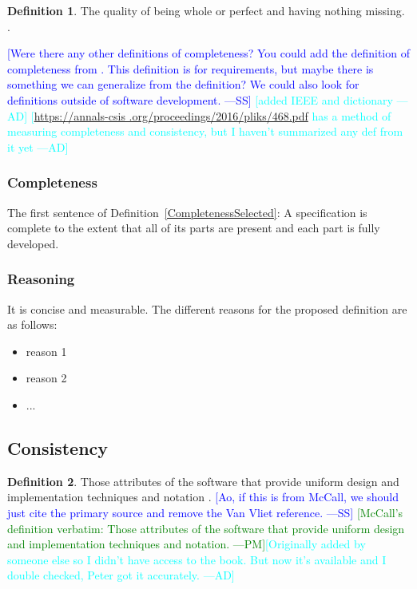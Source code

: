\documentclass[letterpaper, cleveref]{lipics-v2019}
\newcommand{\authornote}[3]{\textcolor{#1}{[#3 ---#2]}}
\newcommand{\authornote}[3]{}
\newcommand{\wss}[1]{\authornote{blue}{SS}{#1}} %
\newcommand{\pmi}[1]{\authornote{green}{PM}{#1}} %
\newcommand{\ad}[1]{\authornote{cyan}{AD}{#1}} %
\newcommand{\notdone}[1]{\textcolor{red}{#1}}
\theoremstyle{definition}
\newtheorem{defn}{Definition}
\begin{document}
\begin{defn}
The quality of being whole or perfect and having nothing missing.
\citep{CambridgeCompleteness2019}.
\end{defn}

\wss{Were there any other definitions of completeness?  You could add the
definition of completeness from \citet[p.\ 5--6]{IEEE1998}.  This definition
is for requirements, but maybe there is something we can generalize from the
definition?  We could also look for definitions outside of software
development.} \ad{added IEEE and dictionary} \ad{\url{https://annals-csis
.org/proceedings/2016/pliks/468.pdf} has a method of measuring completeness
and consistency, but I haven't summarized any def from it yet}

\begin{mybox}
\subsubsection*{Completeness} 
The first sentence of Definition~\ref{CompletenessSelected}: A specification is
complete to the extent that all of its parts are present and each part is fully
developed.
\end{mybox}

\subsubsection*{Reasoning}

It is concise and measurable.  The different reasons for the proposed definition
are as follows:

\begin{itemize}
  \item reason 1
  \item reason 2
  \item ...
\end{itemize}


\subsection{Consistency} %

\begin{defn}
  Those attributes of the software that provide uniform design and
  implementation techniques and notation \citep{McCallEtAl1977}.  \wss{Ao,
    if this is from McCall, we should just cite the primary source and
    remove the Van Vliet reference.} \pmi{McCall's definition verbatim:
  Those attributes of the software that provide uniform design and
  implementation techniques and notation.}\ad{Originally added by someone
  else so I didn't have access to the book. But now it's available and I
  double checked, Peter got it accurately.}
\end{defn}
\end{document}

